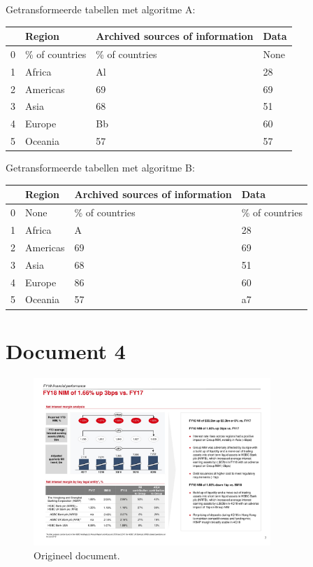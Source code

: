 Getransformeerde tabellen met algoritme A:

\begin{tabular}{llll}
\toprule
{} &          Region & Archived sources of information &  Data \\
\midrule
0 &  \% of countries &                  \% of countries &  None \\
1 &          Africa &                              Al &    28 \\
2 &        Americas &                              69 &    69 \\
3 &            Asia &                              68 &    51 \\
4 &          Europe &                              Bb &    60 \\
5 &         Oceania &                              57 &    57 \\
\bottomrule
\end{tabular}

Getransformeerde tabellen met algoritme B:

\begin{tabular}{llll}
\toprule
{} &    Region & Archived sources of information &            Data \\
\midrule
0 &      None &                  \% of countries &  \% of countries \\
1 &    Africa &                               A &              28 \\
2 &  Americas &                              69 &              69 \\
3 &      Asia &                              68 &              51 \\
4 &    Europe &                              86 &              60 \\
5 &   Oceania &                              57 &              a7 \\
\bottomrule
\end{tabular}

\section{Document 4}

\begin{figure}[H]
    \centering
    \includegraphics[width=0.8\textwidth]{test-resultaten/4/original.jpg}
    \caption{Origineel document.}
\end{figure}

